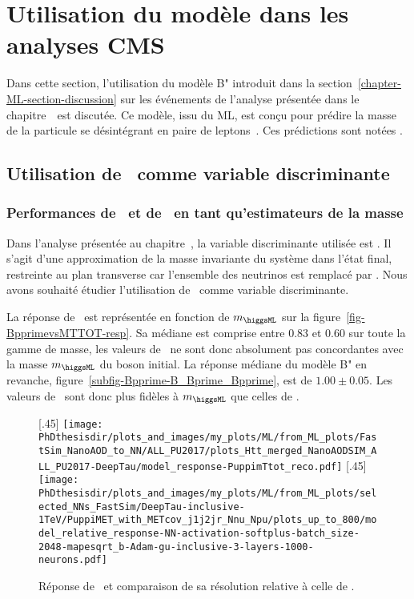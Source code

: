 \section{Utilisation du modèle dans les analyses CMS}\label{chapter-ML-section-use_HTT}
Dans cette section, l'utilisation du modèle B" introduit dans la section~\ref{chapter-ML-section-discussion} sur les événements de l'analyse présentée dans le chapitre~\ est discutée.
Ce modèle, issu du ML, est conçu pour prédire la masse de la particule se désintégrant en paire de leptons~\tau.
Ces prédictions sont notées \mml.
\subsection{Utilisation de \mml\ comme variable discriminante}
\subsubsection{Performances de \mml\ et de \mTtot\ en tant qu'estimateurs de la masse}
Dans l'analyse présentée au chapitre~,
la variable discriminante utilisée est \mTtot.
Il s'agit d'une approximation de la masse invariante du système dans l'état final,
restreinte au plan transverse car l'ensemble des neutrinos est remplacé par \MET.
Nous avons souhaité étudier l'utilisation de \mml\ comme variable discriminante.
\par
La réponse de \mTtot\ est représentée en fonction de $m_{\higgsML}$ sur la figure~\ref{fig-BpprimevsMTTOT-resp}.
Sa médiane est comprise entre \num{0.83} et \num{0.60} sur toute la gamme de masse,
les valeurs de \mTtot\ ne sont donc absolument pas concordantes avec la masse $m_{\higgsML}$ du boson initial.
La réponse médiane du modèle B" en revanche, figure~\ref{subfig-Bpprime-B_Bprime_Bpprime}, est de $\num{1.00}\pm\num{0.05}$.
Les valeurs de \mml\ sont donc plus fidèles à $m_{\higgsML}$ que celles de \mTtot.
\begin{figure}[h]
\centering

[.45\textwidth]
{\texttt{[image: \\PhDthesisdir/plots\_and\_images/my\_plots/ML/from\_ML\_plots/FastSim\_NanoAOD\_to\_NN/ALL\_PU2017/plots\_Htt\_merged\_NanoAODSIM\_ALL\_PU2017-DeepTau/model\_response-PuppimTtot\_reco.pdf]}\vspace{-.5\baselineskip}}
\hfill
{}[.45\textwidth]
{\texttt{[image: \\PhDthesisdir/plots\_and\_images/my\_plots/ML/from\_ML\_plots/selected\_NNs\_FastSim/DeepTau-inclusive-1TeV/PuppiMET\_with\_METcov\_j1j2jr\_Nnu\_Npu/plots\_up\_to\_800/model\_relative\_response-NN-activation-softplus-batch\_size-2048-mapesqrt\_b-Adam-gu-inclusive-3-layers-1000-neurons.pdf]}\vspace{-.5\baselineskip}}

\caption{Réponse de \mTtot\ et comparaison de sa résolution relative à celle de \mml.}
\label{fig-BpprimevsMTTOT}
\end{figure}

